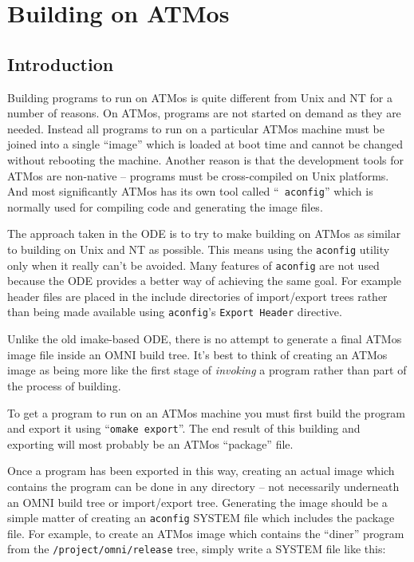 \documentclass[11pt,twoside,onecolumn]{article}
\begin{document}
\section{Building on ATMos}

\subsection{Introduction}

Building programs to run on ATMos is quite different from Unix and NT for a
number of reasons.  On ATMos, programs are not started on demand as they are
needed.  Instead all programs to run on a particular ATMos machine must be
joined into a single ``image'' which is loaded at boot time and cannot be
changed without rebooting the machine.  Another reason is that the development
tools for ATMos are non-native -- programs must be cross-compiled on Unix
platforms.  And most significantly ATMos has its own tool called ``{\tt
aconfig}'' which is normally used for compiling code and generating the image
files.

The approach taken in the ODE is to try to make building on ATMos as similar to
building on Unix and NT as possible.  This means using the {\tt aconfig}
utility only when it really can't be avoided.  Many features of {\tt aconfig}
are not used because the ODE provides a better way of achieving the same goal.
For example header files are placed in the include directories of import/export
trees rather than being made available using {\tt aconfig}'s {\tt Export
Header} directive.

Unlike the old imake-based ODE, there is no attempt to generate a final ATMos
image file inside an OMNI build tree.  It's best to think of creating an ATMos
image as being more like the first stage of {\em invoking} a program rather
than part of the process of building.

To get a program to run on an ATMos machine you must first build the program
and export it using ``{\tt omake export}''.  The end result of this building
and exporting will most probably be an ATMos ``package'' file.

\label{imageanywhere}
Once a program has been exported in this way, creating an actual image which
contains the program can be done in any directory -- not necessarily underneath
an OMNI build tree or import/export tree.  Generating the image should be
a simple matter of creating an {\tt aconfig} SYSTEM file which includes the
package file.  For example, to create an ATMos image which contains the
``diner'' program from the {\tt /project/omni/release} tree, simply write a
SYSTEM file like this:
\end{document}
